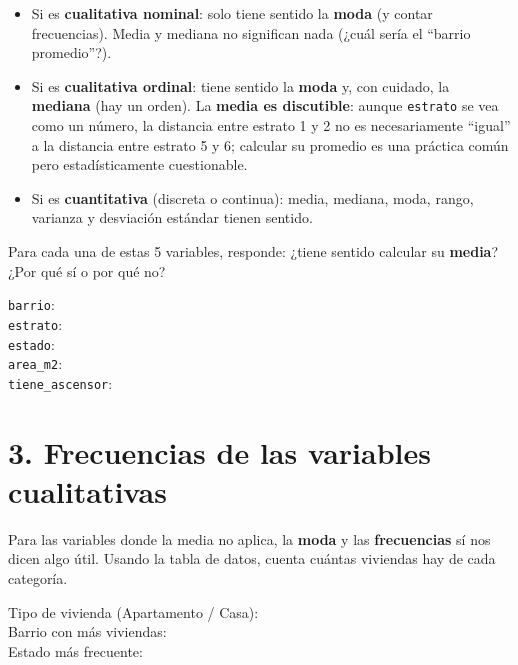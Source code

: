 \documentclass[11pt]{article}
\begin{document}
\begin{itemize}[itemsep=2pt]
  \item Si es \textbf{cualitativa nominal}: solo tiene sentido la
    \textbf{moda} (y contar frecuencias). Media y mediana no significan
    nada (¿cuál sería el ``barrio promedio''?).
  \item Si es \textbf{cualitativa ordinal}: tiene sentido la \textbf{moda}
    y, con cuidado, la \textbf{mediana} (hay un orden). La \textbf{media
    es discutible}: aunque \texttt{estrato} se vea como un número, la
    distancia entre estrato 1 y 2 no es necesariamente ``igual'' a la
    distancia entre estrato 5 y 6; calcular su promedio es una práctica
    común pero estadísticamente cuestionable.
  \item Si es \textbf{cuantitativa} (discreta o continua): media,
    mediana, moda, rango, varianza y desviación estándar tienen sentido.
\end{itemize}

\begin{pregunta}
Para cada una de estas 5 variables, responde: ¿tiene sentido calcular su
\textbf{media}? ¿Por qué sí o por qué no?
\end{pregunta}
\begin{espacio}[5.5cm]
\small \texttt{barrio}: \\[8pt]
\texttt{estrato}: \\[8pt]
\texttt{estado}: \\[8pt]
\texttt{area\_m2}: \\[8pt]
\texttt{tiene\_ascensor}:
\end{espacio}

\section*{3. Frecuencias de las variables cualitativas}

Para las variables donde la media no aplica, la \textbf{moda} y las
\textbf{frecuencias} sí nos dicen algo útil. Usando la tabla de datos,
cuenta cuántas viviendas hay de cada categoría.

\begin{espacio}[4.5cm]
\small Tipo de vivienda (Apartamento / Casa): \\[10pt]
Barrio con más viviendas: \\[10pt]
Estado más frecuente:
\end{espacio}

\newpage
\end{document}
